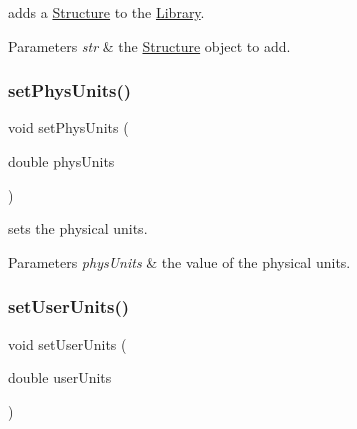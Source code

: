 adds a \hyperlink{class_a_g_d_s_1_1_structure}{Structure} to the \hyperlink{class_a_g_d_s_1_1_library}{Library}. 


\begin{DoxyParams}{Parameters}
{\em str} & the \hyperlink{class_a_g_d_s_1_1_structure}{Structure} object to add. \\
\hline
\end{DoxyParams}
\mbox{\label{class_a_g_d_s_1_1_library_a938acb6eb8d14aade9dba7331c75ff0a}} 
\subsubsection{\texorpdfstring{set\+Phys\+Units()}{setPhysUnits()}}
{\footnotesize\ttfamily void set\+Phys\+Units (\begin{DoxyParamCaption}\item[{double}]{phys\+Units }\end{DoxyParamCaption})\hspace{0.3cm}{\ttfamily [inline]}}



sets the physical units. 


\begin{DoxyParams}{Parameters}
{\em phys\+Units} & the value of the physical units. \\
\hline
\end{DoxyParams}
\mbox{\label{class_a_g_d_s_1_1_library_a0d0e972bb142f892c462bb8d7f04a50b}} 
\subsubsection{\texorpdfstring{set\+User\+Units()}{setUserUnits()}}
{\footnotesize\ttfamily void set\+User\+Units (\begin{DoxyParamCaption}\item[{double}]{user\+Units }\end{DoxyParamCaption})\hspace{0.3cm}{\ttfamily [inline]}}



